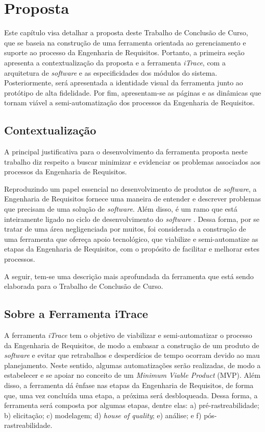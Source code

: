 \chapter[Proposta]{Proposta}

\label{chap:proposta}

Este capítulo visa detalhar a proposta deste Trabalho de Conclusão de Curso, que se baseia na construção de uma ferramenta orientada ao gerenciamento e suporte ao processo da Engenharia de Requisitos. Portanto, a primeira seção apresenta a contextualização da proposta e a ferramenta \textit{iTrace}, com a arquitetura de \textit{software} e as especificidades dos módulos do sistema. Posteriormente, será apresentada a identidade visual da ferramenta junto ao protótipo de alta fidelidade. Por fim, apresentam-se as páginas e as dinâmicas que tornam viável a semi-automatização dos processos da Engenharia de Requisitos.

\section{Contextualização}
A principal justificativa para o desenvolvimento da ferramenta proposta neste trabalho diz respeito a buscar minimizar e evidenciar os problemas associados aos processos da Engenharia de Requisitos.

Reproduzindo um papel essencial no desenvolvimento de produtos de \textit{software}, a Engenharia de Requisitos fornece uma maneira de entender e descrever problemas que precisam de uma solução de \textit{software}. Além disso, é um ramo que está inteiramente ligado no ciclo de desenvolvimento do \textit{software} \cite{elliott2012software}. Dessa forma, por se tratar de uma área negligenciada por muitos, foi considerada a construção de uma ferramenta que ofereça apoio tecnológico, que viabilize e semi-automatize as etapas da Engenharia de Requisitos, com o propósito de facilitar e melhorar estes processos.

A seguir, tem-se uma descrição mais aprofundada da ferramenta que está sendo elaborada para o Trabalho de Conclusão de Curso.

\section{Sobre a Ferramenta iTrace}
A ferramenta \textit{iTrace} tem o objetivo de viabilizar e semi-automatizar o processo da Engenharia de Requisitos, de modo a embasar a construção de um produto de \textit{software} e evitar que retrabalhos e desperdícios de tempo ocorram devido ao mau planejamento. Neste sentido, algumas automatizações serão realizadas, de modo a estabelecer e se apoiar no conceito de um \textit{Minimum Viable Product} (MVP). Além disso, a ferramenta dá ênfase nas etapas da Engenharia de Requisitos, de forma que, uma vez concluída uma etapa, a próxima será desbloqueada. Dessa forma, a ferramenta será composta por algumas etapas, dentre elas: a) pré-rastreabilidade; b) elicitação; c) modelagem; d) \textit{house of quality}; e) análise; e f) pós-rastreabilidade. 

